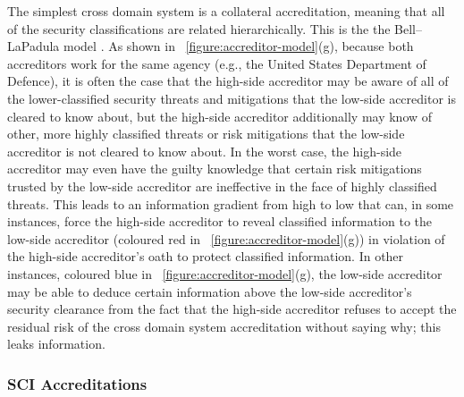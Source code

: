 \documentclass[10pt,letterpaper,conference]{IEEEtran}
\begin{document}
The simplest cross domain system is a collateral accreditation, meaning that all of the security
classifications are related hierarchically. This is the the Bell--LaPadula model \cite{Bell1973}.
As shown in \figurename~\ref{figure:accreditor-model}(g), because both
accreditors work for the same agency (e.g., the United States Department of Defence), it is often
the case that the high-side accreditor may be aware of all of the lower-classified security threats
and mitigations that the low-side accreditor is cleared to know about, but the high-side accreditor
additionally may know of other, more highly classified threats or risk mitigations that the
low-side accreditor is not cleared to know about. In the worst case, the high-side accreditor may
even have the guilty knowledge that certain risk mitigations trusted by the low-side accreditor are
ineffective in the face of highly classified threats. This leads to an information gradient from
high to low that can, in some instances, force the high-side accreditor to reveal classified
information to the low-side accreditor (coloured red in
\figurename~\ref{figure:accreditor-model}(g)) in violation of the high-side accreditor's oath
to protect classified information. In other instances, coloured blue in
\figurename~\ref{figure:accreditor-model}(g), the low-side accreditor may be able to deduce
certain information above the low-side accreditor's security clearance from the fact
that the high-side accreditor refuses to accept the residual risk of the cross domain system
accreditation without saying why; this leaks information.

\subsubsection{SCI Accreditations}
\end{document}
